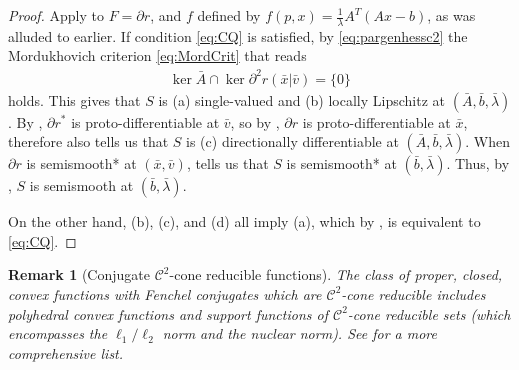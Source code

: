 \documentclass[reqno]{amsart}
\newtheorem{remark}[proposition]{Remark}
\numberwithin{equation}{section}
\newcommand{\R}{\mathbb{R}}
\newcommand{\x}{\bar{x}}
\newcommand{\para}{\mathrm{par}\,}
\newcommand{\lin}{\mathrm{span}\,}
\begin{document}
\begin{proof}
    Apply  to $F = \partial r$, and $f$ defined by $f(p, x) = \frac{1}{\lambda} A^T(Ax - b)$, as was alluded to earlier.
 If condition \eqref{eq:CQ} is satisfied, by \eqref{eq:pargenhessc2} the Mordukhovich criterion \eqref{eq:MordCrit} that reads \begin{align*}
        \ker \bar{A} \cap \ker \partial^2 r(\bar{x} | \bar{v}) = \{0\}
    \end{align*} 
    holds. This gives that $S$ is (a) single-valued and (b) locally Lipschitz at $(\bar A, \bar b, \bar \lambda)$.
    By , $\partial r^*$ is proto-differentiable at $\bar v$, so by \cite[Proposition 8.41]{RoW 98}, $\partial r$ is proto-differentiable at $\x$, therefore  also tells us that $S$ is (c) directionally differentiable at $(\bar A, \bar b, \bar \lambda)$.
    When $\partial r$ is semismooth* at $(\bar x, \bar v)$,  tells us that $S$ is semismooth* at $(\bar b, \bar \lambda)$. Thus, by , $S$ is semismooth at $(\bar b, \bar \lambda)$.

    On the other hand, (b), (c), and (d) all imply (a), which by
    \cite[Theorem 4]{CHNS 26}, is equivalent to \eqref{eq:CQ}.
\end{proof}




\begin{remark}[Conjugate $\mathcal{C}^2$-cone reducible functions]
    The class of proper, closed, convex functions with Fenchel conjugates which are $\mathcal{C}^2$-cone reducible includes polyhedral convex functions and support functions of $\mathcal{C}^2$-cone reducible sets (which encompasses the $\ell_1/\ell_2$ norm and the nuclear norm). See \cite[Remark 2]{CHNS 26} for a more comprehensive list.
\end{remark}
\end{document}
